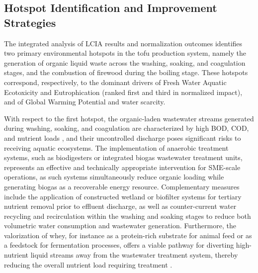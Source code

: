 \documentclass[12pt,a4paper]{article}
\begin{document}
\subsection{Hotspot Identification and Improvement Strategies}

The integrated analysis of LCIA results and normalization outcomes identifies two primary environmental
hotspots in the tofu production system, namely the generation of organic liquid waste across the
washing, soaking, and coagulation stages, and the combustion of firewood during the boiling stage.
These hotspots correspond, respectively, to the dominant drivers of Fresh Water Aquatic Ecotoxicity
and Eutrophication (ranked first and third in normalized impact), and of Global Warming Potential and
water scarcity.

With respect to the first hotspot, the organic-laden wastewater streams generated during washing,
soaking, and coagulation are characterized by high BOD, COD, and nutrient loads
\citep{Seroja2018, Satar2022}, and their uncontrolled discharge poses significant risks to receiving
aquatic ecosystems. The implementation of anaerobic treatment systems, such as biodigesters or
integrated biogas wastewater treatment units, represents an effective and technically appropriate
intervention for SME-scale operations, as such systems simultaneously reduce organic loading while
generating biogas as a recoverable energy resource. Complementary measures include the application of
constructed wetland or biofilter systems for tertiary nutrient removal prior to effluent discharge, as
well as counter-current water recycling and recirculation within the washing and soaking stages to
reduce both volumetric water consumption and wastewater generation. Furthermore, the valorization of
whey, for instance as a protein-rich substrate for animal feed or as a feedstock for fermentation
processes, offers a viable pathway for diverting high-nutrient liquid streams away from the wastewater
treatment system, thereby reducing the overall nutrient load requiring treatment \citep{Bjornbet2021}.
\end{document}
